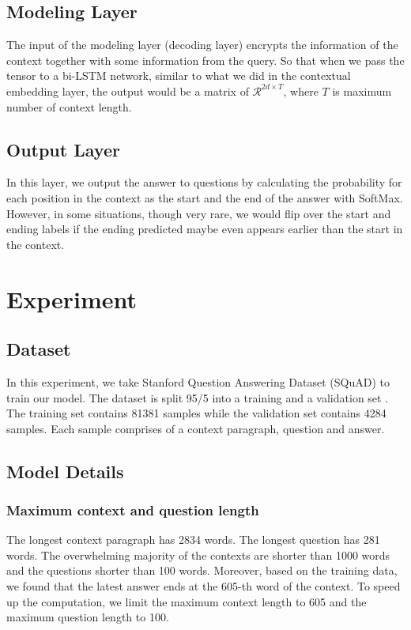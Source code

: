 \documentclass{article} %
\begin{document}
\subsection{Modeling Layer}

The input of the modeling layer (decoding layer) encrypts the information of the context together with some information from the query. So that when we pass the tensor to a bi-LSTM network, similar to what we did in the contextual embedding layer, the output would be a matrix of $\mathcal{R}^{2d\times T}$, where $T$ is maximum number of context length.

\subsection{Output Layer}

In this layer, we output the answer to questions by calculating the probability for each position in the context as the start and the end of the answer with SoftMax. However, in some situations, though very rare, we would flip over the start and ending labels if the ending predicted maybe even appears earlier than the start in the context. 


\section{Experiment}
\subsection{Dataset}
In this experiment, we take Stanford Question Answering Dataset (SQuAD) to train our model.
The dataset is split 95/5 into a training and a validation set . The training set contains 81381 samples while the validation set contains 4284 samples. Each sample comprises of a context paragraph, question and answer.
\subsection{Model Details}
\subsubsection{Maximum context and question length}
The longest context paragraph has 2834 words. The longest question has 281 words. The overwhelming majority of the contexts are shorter than 1000 words and the questions shorter than 100 words. Moreover, based on the training data, we found that the latest answer ends at the 605-th word of the context. To speed up the computation, we limit the maximum context length to 605 and the maximum question length to 100.
\end{document}
